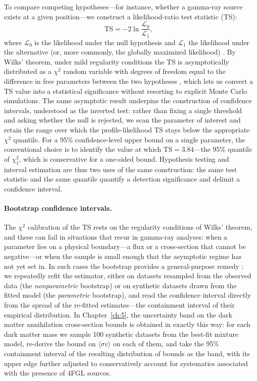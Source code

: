 To compare competing hypotheses---for instance, whether a gamma-ray source exists at a given position---we construct a likelihood-ratio test statistic (TS):
\begin{equation}
	\mathrm{TS} = -2 \ln \frac{\mathcal{L}_0}{\mathcal{L}_1},
	\label{eq:ts}
\end{equation}
where $\mathcal{L}_0$ is the likelihood under the null hypothesis and $\mathcal{L}_1$ the likelihood under the alternative (or, more commonly, the globally maximized likelihood) \cite{Mattox:1996zz}.
By Wilks' theorem, under mild regularity conditions the TS is asymptotically distributed as a $\chi^2$ random variable with degrees of freedom equal to the difference in free parameters between the two hypotheses \cite{Wilks:1938}, which lets us convert a TS value into a statistical significance without resorting to explicit Monte Carlo simulations.
The same asymptotic result underpins the construction of confidence intervals, understood as the inverted test: rather than fixing a single threshold and asking whether the null is rejected, we scan the parameter of interest and retain the range over which the profile-likelihood TS stays below the appropriate $\chi^2$ quantile.
For a 95\% confidence-level upper bound on a single parameter, the conventional choice is to identify the value at which $\mathrm{TS} = 3.84$---the 95\% quantile of $\chi^2_1$, which is conservative for a one-sided bound.
Hypothesis testing and interval estimation are thus two uses of the same construction: the same test statistic and the same quantile quantify a detection significance and delimit a confidence interval.

\paragraph{Bootstrap confidence intervals.}

The $\chi^2$ calibration of the TS rests on the regularity conditions of Wilks' theorem, and these can fail in situations that recur in gamma-ray analyses: when a parameter lies on a physical boundary---a flux or a cross-section that cannot be negative---or when the sample is small enough that the asymptotic regime has not yet set in.
In such cases the bootstrap provides a general-purpose remedy \cite{Efron:1979}: we repeatedly refit the estimator, either on datasets resampled from the observed data (the \emph{nonparametric} bootstrap) or on synthetic datasets drawn from the fitted model (the \emph{parametric} bootstrap), and read the confidence interval directly from the spread of the re-fitted estimates---the containment interval of their empirical distribution.
In Chapter~\ref{ch:5}, the uncertainty band on the dark matter annihilation cross-section bounds is obtained in exactly this way: for each dark matter mass we sample 100 synthetic datasets from the best-fit mixture model, re-derive the bound on $\langle \sigma v \rangle$ on each of them, and take the 95\% containment interval of the resulting distribution of bounds as the band, with its upper edge further adjusted to conservatively account for systematics associated with the presence of 4FGL sources.

